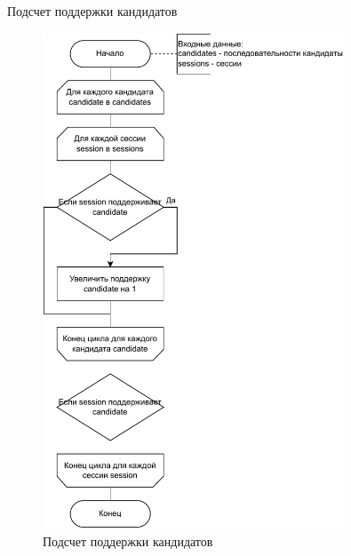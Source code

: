 Подсчет поддержки кандидатов

\begin{figure}[h!]
	\centering
	\includegraphics[width=0.8\textwidth]{inc/img/countSupport.drawio.pdf}
	\caption{Подсчет поддержки кандидатов}
	\label{countSupport}
\end{figure}

